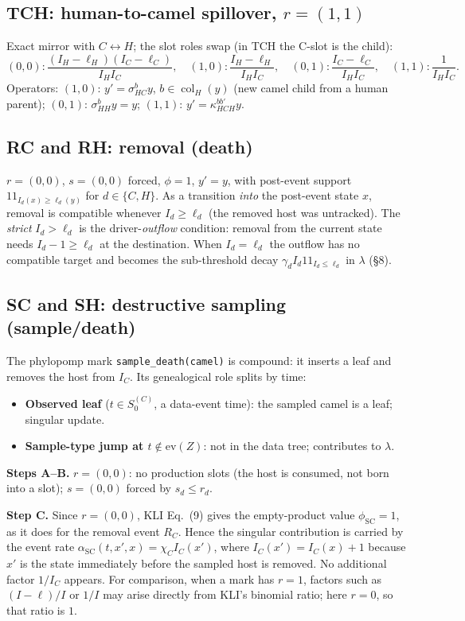 \documentclass[11pt]{article}
\newcommand{\col}{\operatorname{col}}
\newcommand{\evZ}{\mathrm{ev}(Z)}
\newcommand{\ind}{1\!\!1}
\theoremstyle{plain}
\begin{document}
\subsection{TCH: human-to-camel spillover, $r=(1,1)$}
Exact mirror with $C\leftrightarrow H$; the slot roles swap (in TCH the C-slot is the child):
\[
(0,0):\frac{(I_H-\ell_H)(I_C-\ell_C)}{I_HI_C},\quad
(1,0):\frac{I_H-\ell_H}{I_HI_C},\quad
(0,1):\frac{I_C-\ell_C}{I_HI_C},\quad
(1,1):\frac{1}{I_HI_C}.
\]
Operators: $(1,0)$: $y'=\sigma^b_{HC}y$, $b\in\col_H(y)$ (new camel child from a human parent);
$(0,1)$: $\sigma^b_{HH}y=y$; $(1,1)$: $y'=\kappa^{bb'}_{HCH}y$.

\subsection{RC and RH: removal (death)}
$r=(0,0)$, $s=(0,0)$ forced, $\phi=1$, $y'=y$, with post-event support $\ind_{I_d(x)\ge\ell_d(y)}$ for $d\in\{C,H\}$. As a transition
\emph{into} the post-event state $x$, removal is compatible whenever $I_d\ge\ell_d$ (the removed host
was untracked). The \emph{strict} $I_d>\ell_d$ is the driver-\emph{outflow} condition: removal
from the current state needs $I_d-1\ge\ell_d$ at the destination. When $I_d=\ell_d$ the outflow has no
compatible target and becomes the sub-threshold decay $\gamma_d I_d\ind_{I_d\le\ell_d}$ in $\lambda$
(\S8).

\subsection{SC and SH: destructive sampling (sample/death)}
The phylopomp mark \texttt{sample\_death(camel)} is compound: it inserts a leaf and removes the host
from $I_C$. Its genealogical role splits by time:
\begin{itemize}[leftmargin=1.6em,nosep]
\item \textbf{Observed leaf} ($t\in S^{(C)}_0$, a data-event time): the sampled camel is a leaf;
singular update.
\item \textbf{Sample-type jump at $t\notin\evZ$}: not in the data tree; contributes to $\lambda$.
\end{itemize}
\textbf{Steps A--B.} $r=(0,0)$: no production slots (the host is consumed, not born into a slot);
$s=(0,0)$ forced by $s_d\le r_d$.

\textbf{Step C.} Since $r=(0,0)$, KLI Eq.~(9) gives the empty-product value $\phi_{\mathrm{SC}}=1$,
as it does for the removal event $R_C$. Hence the singular contribution is carried by the event rate
$\alpha_{\mathrm{SC}}(t,x',x)=\chi_C I_C(x')$, where $I_C(x')=I_C(x)+1$ because $x'$ is the state
immediately before the sampled host is removed. No additional factor $1/I_C$ appears. For comparison,
when a mark has $r=1$, factors such as $(I-\ell)/I$ or $1/I$ may arise directly from KLI's binomial
ratio; here $r=0$, so that ratio is $1$.
\end{document}
